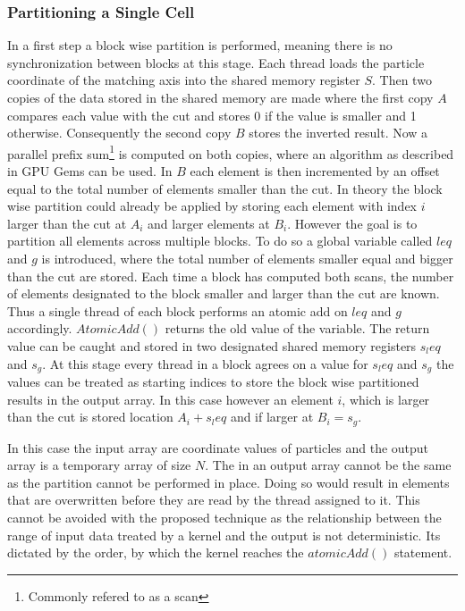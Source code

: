 \documentclass[]{article}
\begin{document}
\subsubsection{Partitioning a Single Cell}

In a first step a block wise partition is performed, meaning there is no synchronization between blocks at this stage. Each thread loads the particle coordinate of the matching axis into the shared memory register $S$. Then two copies of the data stored in the shared memory are made where the first copy $A$ compares each value with the cut and stores 0 if the value is smaller and 1 otherwise. Consequently the second copy $B$ stores the inverted result. 
Now a parallel prefix sum\footnote{Commonly refered to as a scan} is computed on both copies, where an algorithm as described in GPU Gems \cite{SCAN} can be used. In $B$ each element is then incremented by an offset equal to the total number of elements smaller than the cut. 
In theory the block wise partition could already be applied by storing each element with index $i$ larger than the cut at $A_i$ and larger elements at $B_i$. 
However the goal is to partition all elements across multiple blocks. To do so a global variable called $leq$ and $g$ is introduced, where the total number of elements smaller equal and bigger than the cut are stored. Each time a block has computed both scans, the number of elements designated to the block smaller and larger than the cut are known. Thus a single thread of each block performs an atomic add on $leq$ and $g$ accordingly. $AtomicAdd()$ returns the old value of the variable. The return value can be caught and stored in two designated shared memory registers $s_leq$ and $s_g$. 
At this stage every thread in a block agrees on a value for $s_leq$ and $s_g$ the values can be treated as starting indices to store the block wise partitioned results in the output array. In this case however an element $i$, which is larger than the cut is stored location $A_i + s_leq$ and if larger at $B_i = s_g$. 

In this case the input array are coordinate values of particles and the output array is a temporary array of size $N$. The in an output array cannot be the same as the partition cannot be performed in place. Doing so would result in elements that are overwritten before they are read by the thread assigned to it. This cannot be avoided with the proposed technique as the relationship between the range of input data treated by a kernel and the output is not deterministic. Its dictated by the order, by which the kernel reaches the $atomicAdd()$ statement. 
\end{document}
